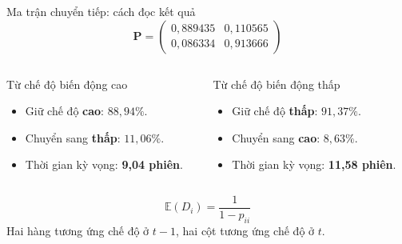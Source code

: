 \documentclass[aspectratio=169,10pt]{beamer}
\newcommand{\slideRef}{}
\newcommand{\src}[1]{\gdef\slideRef{#1}}
\newcommand{\notegray}[1]{{\small\color{midgray}#1}}
\begin{document}
\begin{frame}{Ma trận chuyển tiếp: cách đọc kết quả}
\centering
\[\boxed{\mathbf P=\begin{pmatrix}
0{,}889435&0{,}110565\\
0{,}086334&0{,}913666
\end{pmatrix}}\]
\vspace{.08cm}
\begin{columns}[T,onlytextwidth]
\begin{column}{.48\linewidth}
\begin{block}{Từ chế độ biến động cao}
\small\begin{itemize}\setlength{\itemsep}{5pt}
\item Giữ chế độ \textbf{cao}: $88{,}94\%$.
\item Chuyển sang \textbf{thấp}: $11{,}06\%$.
\item Thời gian kỳ vọng: \textbf{9,04 phiên}.
\end{itemize}
\end{block}
\end{column}
\begin{column}{.48\linewidth}
\begin{block}{Từ chế độ biến động thấp}
\small\begin{itemize}\setlength{\itemsep}{5pt}
\item Giữ chế độ \textbf{thấp}: $91{,}37\%$.
\item Chuyển sang \textbf{cao}: $8{,}63\%$.
\item Thời gian kỳ vọng: \textbf{11,58 phiên}.
\end{itemize}
\end{block}
\end{column}
\end{columns}
\vspace{.22cm}
\[
\mathbb{E}(D_i)=\frac{1}{1-p_{ii}}
\]
\notegray{Hai hàng tương ứng chế độ ở $t-1$, hai cột tương ứng chế độ ở $t$.}
\src{Phần II, mục 7.5.4, Bảng P5.2; MS--AR 2026, tr. 3}
\end{frame}
\end{document}
